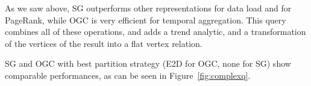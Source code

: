 As we saw above, SG outperforms other representations for data load
and for PageRank, while OGC is very efficient for temporal
aggregation.  This query combines all of these operations, and adds a
trend analytic, and a transformation of the vertices of the result
into a flat vertex relation.

SG and OGC with best partition strategy (E2D for OGC, none for SG)
show comparable performances, as can be seen in
Figure~\ref{fig:complexq}.


